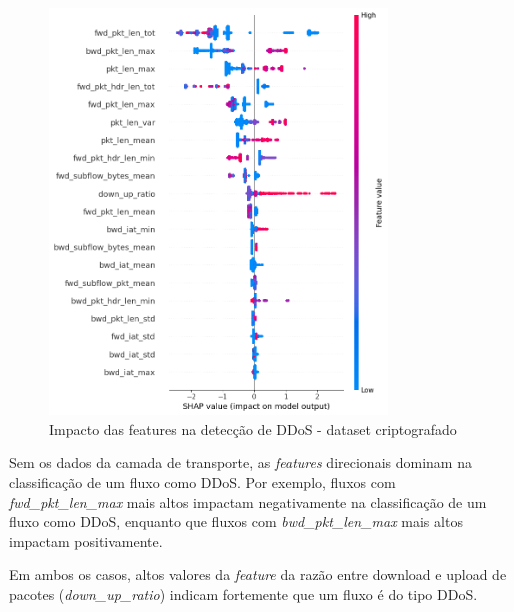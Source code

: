 \documentclass[12pt]{article}
\begin{document}
\begin{figure}[h!]
    \centering
    \includegraphics[width=0.8\textwidth]{figures/summary_ddos_criptografado.png}
    \caption{Impacto das features na detecção de DDoS - dataset criptografado}
    \label{fig:summary_ddos_criptografado}
\end{figure}

Sem os dados da camada de transporte, as \emph{features} direcionais dominam na classificação de um fluxo como DDoS. Por exemplo, fluxos com \textit{fwd\_pkt\_len\_max} mais altos impactam negativamente na classificação de um fluxo como DDoS, enquanto que fluxos com \textit{bwd\_pkt\_len\_max} mais altos impactam positivamente.

Em ambos os casos, altos valores da \textit{feature} da razão entre download e upload de pacotes (\textit{down\_up\_ratio}) indicam fortemente que um fluxo é do tipo DDoS.


\end{document}
